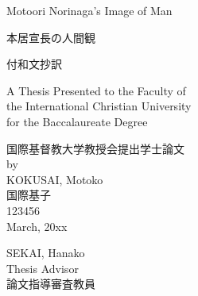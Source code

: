 \begin{titlepage}
    \begin{center}
        \vspace*{1cm}

        \Large
        Motoori Norinaga's Image of Man

        \vspace{0.5cm}

        本居宣長の人間観
        \large

        \vspace{1.5cm}
        付和文抄訳
        \vspace{1.5cm}

        A Thesis Presented to the Faculty of\\
        the International Christian University \\
        for the Baccalaureate Degree \\

        \vspace{0.5cm}

        国際基督教大学教授会提出学士論文\\

        \vfill
        by\\

        \vfill
        KOKUSAI, Motoko\\
        国際基子\\
        123456\\

        \vspace{0.5cm}
        March, 20xx
        \vfill

    \end{center}
    \hspace*{12cm}
    SEKAI, Hanako\\
    \hspace*{12cm}
    Thesis Advisor\\
    \hspace*{12cm}
    論文指導審査教員
\end{titlepage}